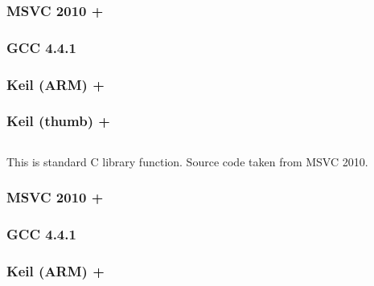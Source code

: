 \subsubsection{MSVC 2010 + \Ox}



\subsubsection{GCC 4.4.1}



\subsubsection{Keil (ARM) + \Othree}



\subsubsection{Keil (thumb) + \Othree}



\subsection{}

{This is standard C library function. Source code taken from MSVC 2010.}

\subsubsection{MSVC 2010 + \Ox}



\subsubsection{GCC 4.4.1}



\subsubsection{Keil (ARM) + \Othree}



